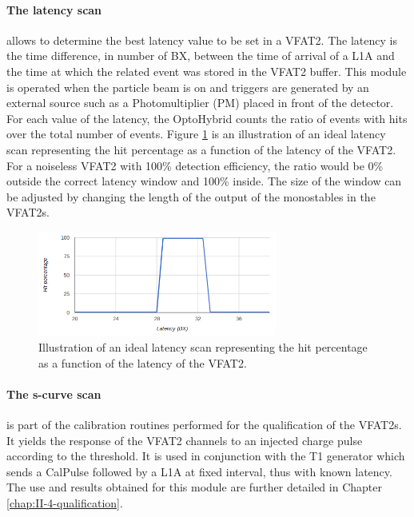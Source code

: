       \paragraph{The latency scan} allows to determine the best latency value to be set in a VFAT2. The latency is the time difference, in number of BX, between the time of arrival of a L1A and the time at which the related event was stored in the VFAT2 buffer. This module is operated when the particle beam is on and triggers are generated by an external source such as a Photomultiplier (PM) placed in front of the detector. For each value of the latency, the OptoHybrid counts the ratio of events with hits over the total number of events. Figure \ref{fig:II-3-latency-scan} is an illustration of an ideal latency scan representing the hit percentage as a function of the latency of the VFAT2. For a noiseless VFAT2 with 100\% detection efficiency, the ratio would be 0\% outside the correct latency window and 100\% inside. The size of the window can be adjusted by changing the length of the output of the monostables in the VFAT2s.

      \begin{figure}[h!]
        \centering
        \includegraphics[width=0.7\textwidth]{img/II-3-test-beam/latency_scan.png}
        \caption{Illustration of an ideal latency scan representing the hit percentage as a function of the latency of the VFAT2.}
        \label{fig:II-3-latency-scan}
      \end{figure}

      \paragraph{The s-curve scan} is part of the calibration routines performed for the qualification of the VFAT2s. It yields the response of the VFAT2 channels to an injected charge pulse according to the threshold. It is used in conjunction with the T1 generator which sends a CalPulse followed by a L1A at fixed interval, thus with known latency. The use and results obtained for this module are further detailed in Chapter \ref{chap:II-4-qualification}.

